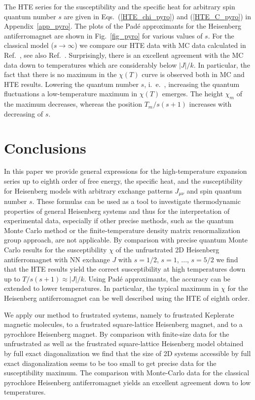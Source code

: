 \documentclass[aps,twocolumn,groupedaddress]{revtex4}
\begin{document}
The HTE series for the susceptibility and the specific heat for arbitrary
spin quantum number $s$ are given in Eqs.~(\ref{HTE_chi_pyro}) and
(\ref{HTE_C_pyro}) in Appendix~\ref{app_pyro}.
The plots of the Pad\'e approximants for the Heisenberg antiferromagnet
are shown in  Fig.~\ref{fig_pyro} for various values of $s$.
For the classical model  ($s \to \infty$)  we compare our HTE data with  MC
data calculated in Ref.~, see also
Ref.~.
Surprisingly, there is an excellent agreement with the MC data down to
temperatures which are considerably below $|J|/k$. In particular, the fact that
there is no maximum in the $\chi(T)$ curve is observed both in MC and HTE
results.
Lowering the quantum number $s$, i.~e.~, increasing the quantum fluctuations a
low-temperature maximum in $\chi(T)$ emerges. The height $\chi_{m}$ of the maximum
decreases, whereas the position $T_m/s(s+1)$ increases with decreasing of
$s$.\\









\section{Conclusions}
In this paper we provide general expressions for the high-temperature
expansion series  up to eighth order
of free energy, the specific heat,
and the susceptibility for Heisenberg models with arbitrary exchange
patterns $J_{\mu \nu}$ and spin quantum
number $s$. These formulas can be used as a tool to investigate thermodynamic
properties of general Heisenberg systems and thus for the interpretation
of experimental data, especially if other precise methods, such as the quantum
Monte Carlo method or the finite-temperature  density matrix renormalization
group approach, are not applicable.
By comparison with precise quantum Monte Carlo results
for the susceptibility $\chi$ of the unfrustrated
2D Heisenberg antiferromagnet with NN exchange
$J$ with $s=1/2$, $s=1$, ..., $s=5/2$
we find that the HTE results yield
the correct susceptibility at high temperatures down up
to $T/s(s+1) \approx |J|/k$. Using Pad\'e approximants,
the accuracy can be extended to lower temperatures.
In particular, the typical maximum in $\chi$ for the Heisenberg
antiferromagnet can be well described using the HTE of eighth order.

We apply our method to frustrated systems, namely to frustrated Keplerate
magnetic molecules, to a frustrated square-lattice Heisenberg magnet, and to
a pyrochlore Heisenberg magnet.
By comparison with finite-size data
for the unfrustrated as well as the frustrated
square-lattice Heisenberg
model  obtained by full exact diagonalization
we find that the  size of 2D systems accessible by  full exact diagonalization
seems to be too small to get precise data for the susceptibility maximum.
The comparison with Monte-Carlo data for the classical
pyrochlore Heisenberg antiferromagnet yields an excellent agreement down to
low temperatures.  \\
\end{document}
